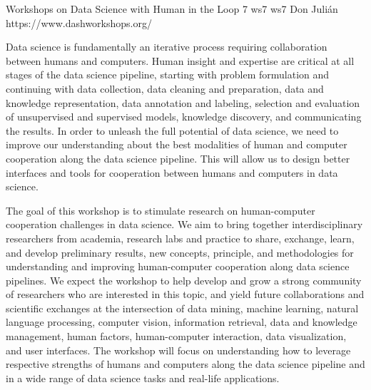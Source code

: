 \begin{wsschedulenolist}
{Workshops on Data Science with Human in the Loop}
{7}
{ws7}
{ws7}
{Don Juli\'an}
{https://www.dashworkshops.org/}

Data science is fundamentally an iterative process requiring collaboration between humans and computers. Human insight and expertise are critical at all stages of the data science pipeline, starting with problem formulation and continuing with data collection, data cleaning and preparation, data and knowledge representation, data annotation and labeling, selection and evaluation of unsupervised and supervised models, knowledge discovery, and communicating the results. In order to unleash the full potential of data science, we need to improve our understanding about the best modalities of human and computer cooperation along the data science pipeline. This will allow us to design better interfaces and tools for cooperation between humans and computers in data science.

The goal of this workshop is to stimulate research on human-computer cooperation challenges in data science. We aim to bring together interdisciplinary researchers from academia, research labs and practice to share, exchange, learn, and develop preliminary results, new concepts, principle, and methodologies for understanding and improving human-computer cooperation along data science pipelines. We expect the workshop to help develop and grow a strong community of researchers who are interested in this topic, and yield future collaborations and scientific exchanges at the intersection of data mining, machine learning, natural language processing, computer vision, information retrieval, data and knowledge management, human factors, human-computer interaction, data visualization, and user interfaces. The workshop will focus on understanding how to leverage respective strengths of humans and computers along the data science pipeline and in a wide range of data science tasks and real-life applications.

\end{wsschedulenolist}
